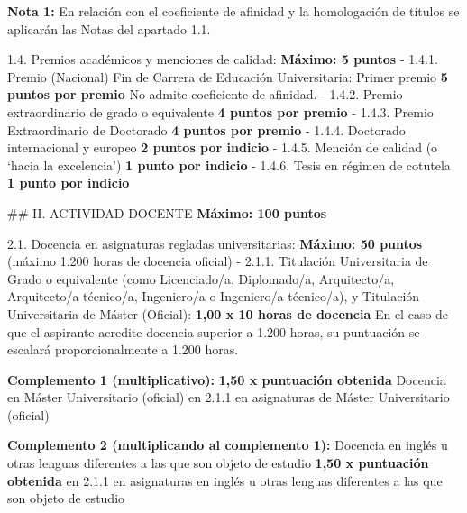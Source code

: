\documentclass{article}
\begin{document}
\begin{itemize}
\begin{itemize}
\begin{scriptsize}
                  \textbf{Nota 1:} En relación con el coeficiente de afinidad y la homologación de títulos se aplicarán las Notas del apartado 1.1.

                  1.4. Premios académicos y menciones de calidad:                                           \textbf{Máximo: 5 puntos}
                  - 1.4.1. Premio (Nacional) Fin de Carrera de Educación Universitaria: Primer premio           \textbf{5 puntos por premio}           No admite coeficiente de afinidad.
                  - 1.4.2. Premio extraordinario de grado o equivalente        \textbf{4 puntos por premio}
                  - 1.4.3. Premio Extraordinario de Doctorado                  \textbf{4 puntos por premio}
                  - 1.4.4. Doctorado internacional y europeo                   \textbf{2 puntos por indicio}
                  - 1.4.5. Mención de calidad (o ‘hacia la excelencia’)        \textbf{1 punto por indicio}
                  - 1.4.6. Tesis en régimen de cotutela                        \textbf{1 punto por indicio}

                  \#\# II. ACTIVIDAD DOCENTE                                                                     \textbf{Máximo: 100 puntos}

                  2.1. Docencia en asignaturas regladas universitarias:                                     \textbf{Máximo: 50 puntos}
                  (máximo 1.200 horas de docencia oficial)
                  - 2.1.1. Titulación Universitaria de Grado o equivalente (como Licenciado/a, Diplomado/a, Arquitecto/a, Arquitecto/a técnico/a, Ingeniero/a o Ingeniero/a técnico/a), y Titulación Universitaria de Máster (Oficial):
                  \textbf{1,00 x 10 horas de docencia}
                  En el caso de que el aspirante acredite docencia superior a 1.200 horas, su puntuación se escalará proporcionalmente a 1.200 horas.

                  \textbf{Complemento 1 (multiplicativo):}                             \textbf{1,50 x puntuación obtenida}
                  Docencia en Máster Universitario (oficial)                  en 2.1.1 en asignaturas de Máster Universitario (oficial)

                  \textbf{Complemento 2 (multiplicando al complemento 1):}
                  Docencia en inglés u otras lenguas diferentes a las que son objeto de estudio                                      \textbf{1,50 x puntuación obtenida}
                  en 2.1.1 en asignaturas en inglés u otras lenguas diferentes a las que son objeto de estudio


\end{scriptsize}
\end{itemize}
\end{itemize}
\end{document}
